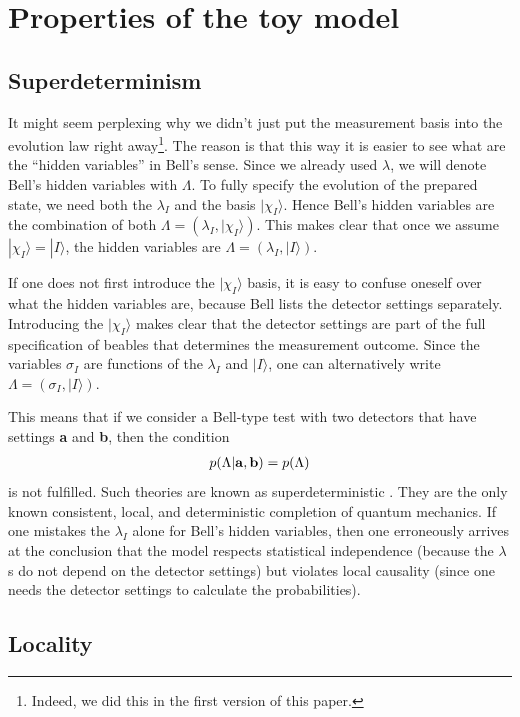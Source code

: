 \documentclass[12pt]{article}
\def\beqn{\begin{eqnarray}}
\def\eeqn{\end{eqnarray}}
\begin{document}
\section{Properties of the toy model}

\subsection{Superdeterminism}

It might seem perplexing why we didn't just put the measurement basis into the evolution law right away\footnote{Indeed, we did this in the first version of this paper.}. The reason is that this way it is easier to see what are the ``hidden variables'' in Bell's sense. Since we already used $\lambda$, we will denote Bell's hidden variables with $\Lambda$. To fully specify the evolution of the prepared state, we need both the $\lambda_I$ and the basis $|\chi_I\rangle$. 
Hence Bell's hidden variables are the combination of both $\Lambda = (\lambda_I, | \chi_I \rangle)$. This makes clear that once we assume $|\chi_I\rangle = |I\rangle$, the hidden variables are $\Lambda = (\lambda_I, | I \rangle)$. 


If one does not first introduce the $|\chi_I \rangle$ basis, it is easy to confuse oneself over what the hidden variables are, because Bell lists the detector settings separately. Introducing the $|\chi_I \rangle$ makes clear that the detector settings are part of the full specification of beables that  determines the measurement outcome.  Since 
the variables $\sigma_I$ are functions of the $\lambda_I$ and $|I\rangle$, one can alternatively write $\Lambda = (\sigma_I, |I \rangle)$.

This means that if we consider a Bell-type test with two detectors that have settings {\bf a} and {\bf b}, then the condition
\beqn
p(\Lambda | \mathrm{\bf a}, \mathrm{\bf b}) = p(\Lambda) 
\eeqn
is not fulfilled. Such theories are known as superdeterministic \cite{Hossenfelder:2019shy}. They are the only known consistent, local, and deterministic completion of quantum mechanics. If one mistakes the $\lambda_I$ alone for Bell's hidden variables, then one erroneously arrives at the conclusion that the model respects statistical independence (because the $\lambda$s do not depend on the detector settings) but violates local causality (since one needs the detector settings to calculate the probabilities).

\subsection{Locality}
\end{document}
